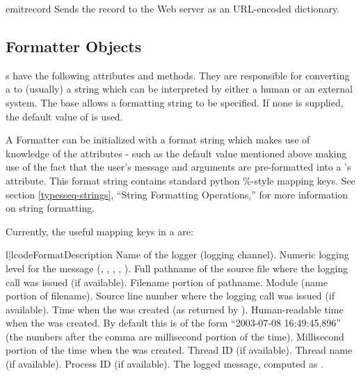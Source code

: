 \begin{methoddesc}{emit}{record}
Sends the record to the Web server as an URL-encoded dictionary.
\end{methoddesc}

\subsection{Formatter Objects}

s have the following attributes and methods. They are
responsible for converting a  to (usually) a string
which can be interpreted by either a human or an external system. The
base
 allows a formatting string to be specified. If none is
supplied, the default value of  is used.

A Formatter can be initialized with a format string which makes use of
knowledge of the  attributes - such as the default value
mentioned above making use of the fact that the user's message and
arguments are pre-formatted into a 's 
attribute.  This format string contains standard python \%-style
mapping keys. See section \ref{typesseq-strings}, ``String Formatting
Operations,'' for more information on string formatting.

Currently, the useful mapping keys in a  are:

\begin{tableii}{l|l}{code}{Format}{Description}
     {Name of the logger (logging channel).}
  {Numeric logging level for the message
                        (, ,
                        , ,
                        ).}
 {Full pathname of the source file where the logging
                        call was issued (if available).}
 {Filename portion of pathname.}
   {Module (name portion of filename).}
   {Source line number where the logging call was issued
                        (if available).}
  {Time when the  was created (as
                        returned by ).}
  {Human-readable time when the 
                        was created.  By default this is of the form
                        ``2003-07-08 16:49:45,896'' (the numbers after the
                        comma are millisecond portion of the time).}
    {Millisecond portion of the time when the
                         was created.}
   {Thread ID (if available).}
   {Thread name (if available).}
  {Process ID (if available).}
  {The logged message, computed as .}
\end{tableii}

